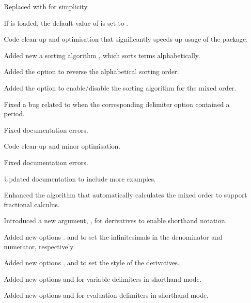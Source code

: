 \begin{changelog}
\begin{change}[version=1.1, date=2021-06-03, beta=false]
		\item Replaced  with  for simplicity.
		\item If  is loaded, the default value of  is set to .
	\end{change}
	\begin{change}[version=1.2, date=2022-07-09, beta=false]
		\item Code clean-up and optimisation that significantly speeds up usage of the package.
		\item Added new a sorting algorithm , which sorts terms alphabetically.
		\item Added the option  to reverse the alphabetical sorting order.
		\item Added the option  to enable/disable the sorting algorithm for the mixed order.
		\item Fixed a bug related to  when the corresponding delimiter option contained a period.
		\item Fixed documentation errors.
	\end{change}
	\begin{change}[version=1.3, date=2023-07-26, beta=false]
		\item Code clean-up and minor optimisation.
		\item Fixed documentation errors.
		\item Updated documentation to include more examples.
		\item Enhanced the algorithm that automatically calculates the mixed order to support fractional calculus.
		\item Introduced a new argument, \targ{!}, for derivatives to enable shorthand notation.
		\item Added new options .
		and  to set the infinitesimals in the denominator and numerator, respectively.
		\item Added new options ,  and  to set the style of the derivatives.
		\item Added new options  and  for variable delimiters in shorthand mode.
		\item Added new options  and  for evaluation delimiters in shorthand mode.

\end{change}
\end{changelog}
